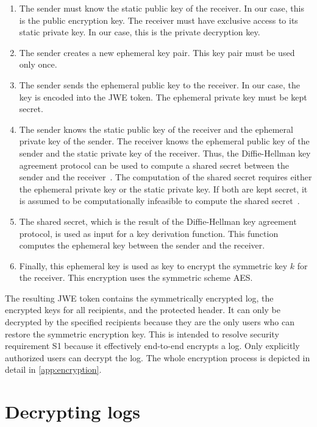 \documentclass[../main.tex]{subfiles}
\begin{document}
\begin{enumerate}
    \item 
    The sender must know the static public key of the receiver. 
    In our case, this is the public encryption key.
    The receiver must have exclusive access to its static private key.
    In our case, this is the private decryption key.
    \item 
    The sender creates a new ephemeral key pair. 
    This key pair must be used only once.
    \item 
    The sender sends the ephemeral public key to the receiver.
    In our case, the key is encoded into the JWE token.
    The ephemeral private key must be kept secret.
    \item 
    The sender knows the static public key of the receiver and the ephemeral private key of the sender.
    The receiver knows the ephemeral public key of the sender and the static private key of the receiver.
    Thus, the Diffie-Hellman key agreement protocol can be used to compute a shared secret between the sender and the receiver~\cite[438]{Eckert2018}.
    The computation of the shared secret requires either the ephemeral private key or the static private key.
    If both are kept secret, it is assumed to be computationally infeasible to compute the shared secret~\cite[438]{Eckert2018}.
    \item 
    The shared secret, which is the result of the Diffie-Hellman key agreement protocol, is used as input for a key derivation function.
    This function computes the ephemeral key between the sender and the receiver.
    \item 
    Finally, this ephemeral key is used as key to encrypt the symmetric key $k$ for the receiver.
    This encryption uses the symmetric scheme AES.
\end{enumerate}


The resulting JWE token contains the symmetrically encrypted log, the encrypted keys for all recipients, and the protected header.
It can only be decrypted by the specified recipients because they are the only users who can restore the symmetric encryption key.
This is intended to resolve security requirement S1 because it effectively end-to-end encrypts a log.
Only explicitly authorized users can decrypt the log.
The whole encryption process is depicted in detail in \cref{app:encryption}.

\section{Decrypting logs}\label{sec:decrypting}
\end{document}
